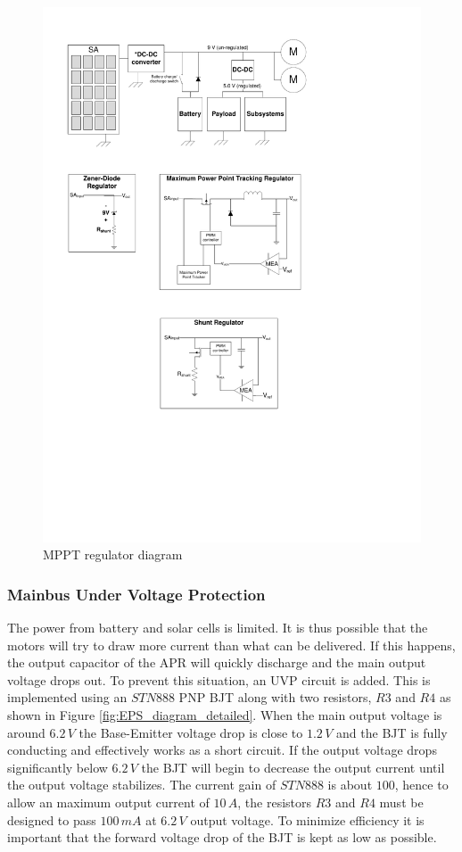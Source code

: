 \begin{figure}[H]
\centering
\includegraphics[scale=1]{figures/fig_PDR_MPPTdiagram}
\caption{\ac{MPPT} regulator diagram}
\label{fig:MPPT_regulator}
\end{figure}
%


\subsubsection{Mainbus Under Voltage Protection}
%
The power from battery and solar cells is limited. It is thus possible that the motors will try to draw more current than what can be delivered. If this happens, the output capacitor of the \ac{APR} will quickly discharge and the main output voltage drops out. To prevent this situation, an \ac{UVP} circuit is added. This is implemented using an $STN888$ PNP \ac{BJT} along with two resistors, $R3$ and $R4$ as shown in Figure \ref{fig:EPS_diagram_detailed}. When the main output voltage is around $6.2\,V$ the Base-Emitter voltage drop is close to $1.2\,V$ and the \ac{BJT} is fully conducting and effectively works as a short circuit. If the output voltage drops significantly below $6.2\,V$ the \ac{BJT} will begin to decrease the output current until the output voltage stabilizes. The current gain of $STN888$ is about $100$, hence to allow an maximum output current of $10\,A$, the resistors $R3$ and $R4$ must be designed to pass $100\,mA$ at $6.2\,V$ output voltage. To minimize efficiency it is important that the forward voltage drop of the \ac{BJT} is kept as low as possible.


